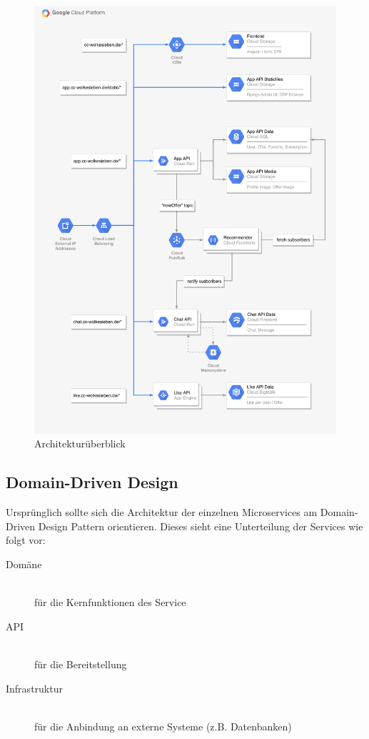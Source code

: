 \documentclass{article}
\begin{document}
\begin{figure}[H]
\centering
\label{fig:architecture}
\includegraphics[width=\textwidth]{images/gcp-architecture}
\caption{Architekturüberblick}
\end{figure}



\subsection{Domain-Driven Design}

Ursprünglich sollte sich die Architektur der einzelnen Microservices am Domain-Driven Design Pattern orientieren. Dieses sieht eine Unterteilung der Services wie folgt vor:

\begin{description}
	\item[Domäne]
	\hfill \\
	für die Kernfunktionen des Service
	\item[API]
	\hfill \\
	für die Bereitstellung
	\item[Infrastruktur]
	\hfill \\
	für die Anbindung an externe Systeme (z.B. Datenbanken)
\end{description}
\end{document}
